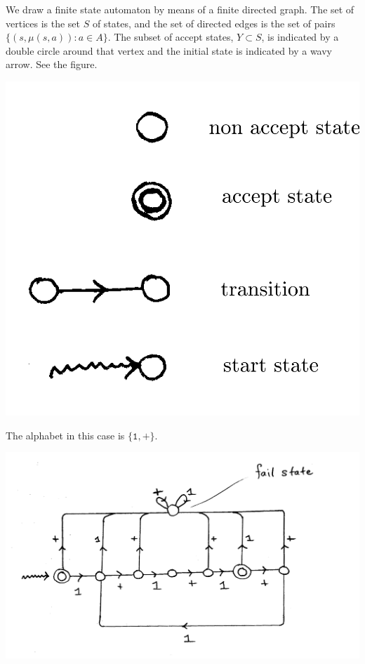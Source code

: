 \begin{ap} We draw a finite state automaton by means of a finite
    directed graph. The set of vertices is the set $S$ of states, and
    the set of directed edges is the set of pairs $\{(s,\mu(s,a)) : a
    \in A\}.$ The subset of accept states, $Y \subset S$, is indicated
    by a double circle around that vertex and the initial state is
    indicated by a wavy arrow. See the figure.

    \begin{center}
    \includegraphics[scale=0.35]{resources/vertices-on-automata.pdf}
    \end{center}
\end{ap}

\begin{eg} The alphabet in this case is $\mathtt{\{1,+\}}.$
    \begin{center}
        \includegraphics[scale=0.25]{resources/plus-1-mod-3.pdf}
    \end{center}
\end{eg}

